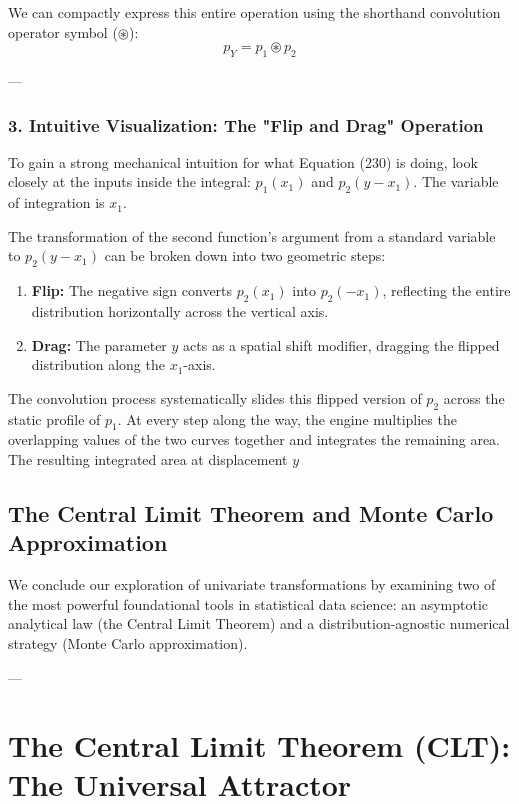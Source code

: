 \documentclass{article}
\begin{document}
We can compactly express this entire operation using the shorthand convolution operator symbol ($\circledast$):
\begin{equation}
p_Y = p_1 \circledast p_2 \tag{231}
\end{equation}

---

\subsubsection*{3. Intuitive Visualization: The "Flip and Drag" Operation}

To gain a strong mechanical intuition for what Equation (230) is doing, look closely at the inputs inside the integral: $p_1(x_1)$ and $p_2(y - x_1)$. The variable of integration is $x_1$. 

The transformation of the second function's argument from a standard variable to $p_2(y - x_1)$ can be broken down into two geometric steps:
\begin{enumerate}
    \item \textbf{Flip:} The negative sign converts $p_2(x_1)$ into $p_2(-x_1)$, reflecting the entire distribution horizontally across the vertical axis.
    \item \textbf{Drag:} The parameter $y$ acts as a spatial shift modifier, dragging the flipped distribution along the $x_1$-axis.
\end{enumerate}

The convolution process systematically slides this flipped version of $p_2$ across the static profile of $p_1$. At every step along the way, the engine multiplies the overlapping values of the two curves together and integrates the remaining area. The resulting integrated area at displacement $y$

\subsection*{The Central Limit Theorem and Monte Carlo Approximation}

We conclude our exploration of univariate transformations by examining two of the most powerful foundational tools in statistical data science: an asymptotic analytical law (the Central Limit Theorem) and a distribution-agnostic numerical strategy (Monte Carlo approximation).

---

\section*{The Central Limit Theorem (CLT): The Universal Attractor}
\end{document}
